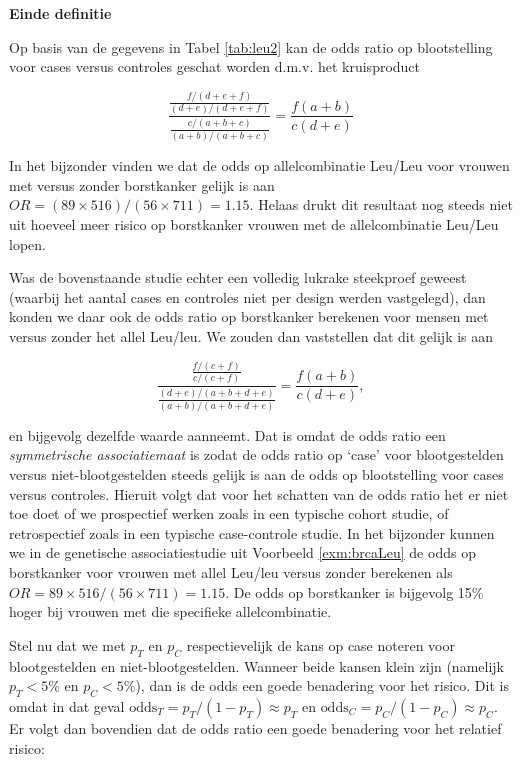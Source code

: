\documentclass[
  12pt,dutch]{book}
\theoremstyle{definition}
\theoremstyle{definition}
\theoremstyle{definition}
\theoremstyle{definition}
\theoremstyle{remark}
\begin{document}
\textbf{Einde definitie}

Op basis van de gegevens in Tabel \ref{tab:leu2} kan de odds ratio op
blootstelling voor cases versus controles geschat worden d.m.v. het kruisproduct

\begin{equation*}
\frac{ \frac{ f/(d+e+f)}{(d+e)/(d+e+f)} }{ \frac{c/(a+b+c)}{(a+b)/(a+b+c)}} = \frac{f(a+b)}{c (d+e)}
\end{equation*}

In het bijzonder vinden we dat de odds op allelcombinatie Leu/Leu voor vrouwen met versus zonder borstkanker gelijk is aan \(OR=(89\times 516)/(56\times 711)=1.15\). Helaas drukt dit resultaat nog steeds
niet uit hoeveel meer risico op borstkanker vrouwen met de allelcombinatie Leu/Leu lopen.

Was de bovenstaande studie echter een volledig lukrake steekproef geweest
(waarbij het aantal cases en controles niet per design werden vastgelegd),
dan konden we daar ook de odds ratio op borstkanker berekenen voor mensen
met versus zonder het allel Leu/leu. We zouden dan vaststellen dat dit gelijk is
aan

\begin{equation*}
\frac{ \frac{ f/(c+f)}{c/(c+f)} }{ \frac{(d+e)/(a+b+d+e)}{(a+b)/(a+b+d+e)}} = \frac{f(a+b)}{c(d+e)},
\end{equation*}

en bijgevolg dezelfde waarde aanneemt. Dat is omdat de odds ratio een
\emph{symmetrische associatiemaat} is zodat de odds ratio op `case' voor
blootgestelden versus niet-blootgestelden steeds gelijk is aan de odds op
blootstelling voor cases versus controles. Hieruit volgt dat voor het
schatten van de odds ratio het er niet toe doet of we prospectief werken
zoals in een typische cohort studie, of retrospectief zoals in een typische
case-controle studie. In het bijzonder kunnen we in de genetische associatiestudie uit
Voorbeeld \ref{exm:brcaLeu} de odds op borstkanker voor vrouwen met allel Leu/leu
versus zonder berekenen als \(OR=89\times 516/(56\times 711)=1.15\).
De odds op borstkanker is bijgevolg 15\% hoger bij vrouwen met die specifieke allelcombinatie.

Stel nu dat we met \(p_T\) en \(p_C\) respectievelijk de kans op case noteren
voor blootgestelden en niet-blootgestelden. Wanneer beide kansen klein zijn
(namelijk \(p_T<5\%\) en \(p_C<5\%\)), dan is de odds een goede benadering voor
het risico. Dit is omdat in dat geval \(\mbox{odds}_T=p_T/(1-p_T)\approx p_T\) en \(\mbox{odds}_C=p_C/(1-p_C)\approx p_C\). Er volgt dan bovendien dat de odds ratio
een goede benadering voor het relatief risico:
\end{document}
